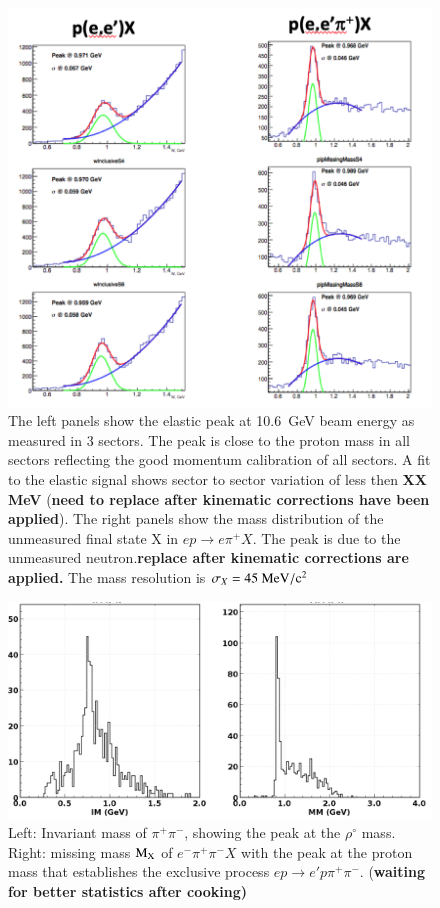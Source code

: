 \documentclass[final,3p,twocolumn]{elsarticle}
\begin{document}
\begin{figure}[htbp!]
\centerline{\includegraphics[width=1.0\columnwidth]{elastic_pi+n.png}}
\caption{The left panels show the elastic peak at 10.6~GeV beam energy as measured in 3 sectors. The peak is close to the
proton mass in all sectors reflecting the good momentum calibration of all sectors. A fit to the elastic signal shows sector
to sector variation of less then {\bf XX MeV} ({\bf need to replace after kinematic corrections have been applied}).
The right panels show the mass distribution of the unmeasured final state X in $ep \to e\pi^+ X$. The peak is due to the
unmeasured neutron.{\bf replace after kinematic corrections are applied.} The mass resolution is $\sigma_X = \rm
45~MeV/c^2$} 
\label{elastic-peak}
\end{figure} 

\begin{figure}[htbp!]
\centerline{\includegraphics[width=1.0\columnwidth]{pip-pim-p.png}}
\caption{Left: Invariant mass of $\pi^+\pi^-$, showing the peak at the $\rho^\circ$ mass. Right: missing mass 
$\rm M_X$  of $e^-\pi^+\pi^-X$ with the peak at the proton mass that establishes the exclusive process
$ep\to e' p \pi^+\pi^-$. ({\bf waiting for better statistics after cooking)}}
\label{pip-pim-p}
\end{figure} 
\end{document}
